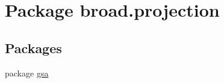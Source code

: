 \hypertarget{namespacebroad_1_1projection}{\section{Package broad.\+projection}
\label{namespacebroad_1_1projection}
}
\subsection*{Packages}
\begin{DoxyCompactItemize}
\item 
package \hyperlink{namespacebroad_1_1projection_1_1gsa}{gsa}
\end{DoxyCompactItemize}
